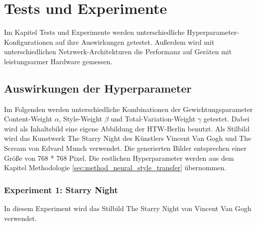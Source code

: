 \chapter{Tests und Experimente}
\label{cha:tests}

Im Kapitel Tests und Experimente werden unterschiedliche Hyperparameter-Konfigurationen auf ihre Auswirkungen getestet. Außerdem wird mit unterschiedlichen
Netzwerk-Architekturen die Performanz auf Geräten mit leistungsarmer Hardware gemessen.

\section{Auswirkungen der Hyperparameter}

Im Folgenden werden unterschiedliche Kombinationen der Gewichtungsparameter Content-Weight $ \alpha $, Style-Weight $ \beta $ und Total-Variation-Weight $ \gamma $ getestet. Dabei wird als Inhaltsbild  eine eigene Abbildung der HTW-Berlin benutzt. Als Stilbild wird das Kunstwerk The Starry Night des Künstlers Vincent Van Gogh und The Scream von Edvard Munch verwendet. Die generierten Bilder entsprechen einer Größe von 768 * 768 Pixel. Die restlichen Hyperparameter werden aus dem Kapitel Methodologie \ref{sec:method_neural_style_transfer} übernommen.

\pagebreak

\subsection{Experiment 1: Starry Night}

In diesem Experiment wird das Stilbild The Starry Night von Vincent Van Gogh verwendet.

